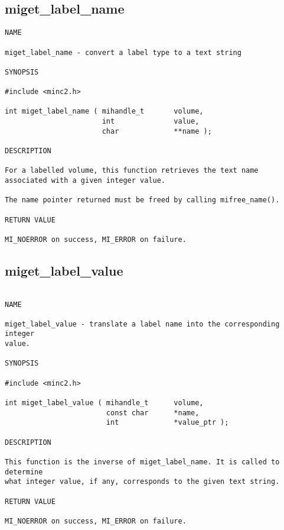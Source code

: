 \documentclass{article}
\begin{document}
\subsection{miget\_label\_name}
\begin{verbatim}
NAME

miget_label_name - convert a label type to a text string

SYNOPSIS

#include <minc2.h>

int miget_label_name ( mihandle_t       volume, 
                       int              value, 
                       char             **name );

DESCRIPTION

For a labelled volume, this function retrieves the text name
associated with a given integer value.

The name pointer returned must be freed by calling mifree_name().

RETURN VALUE

MI_NOERROR on success, MI_ERROR on failure.
\end{verbatim}

\subsection{miget\_label\_value}
\begin{verbatim}

NAME

miget_label_value - translate a label name into the corresponding integer
value.

SYNOPSIS

#include <minc2.h>

int miget_label_value ( mihandle_t      volume, 
                        const char      *name, 
                        int             *value_ptr );

DESCRIPTION

This function is the inverse of miget_label_name. It is called to determine
what integer value, if any, corresponds to the given text string.

RETURN VALUE

MI_NOERROR on success, MI_ERROR on failure.
\end{verbatim}
\end{document}
